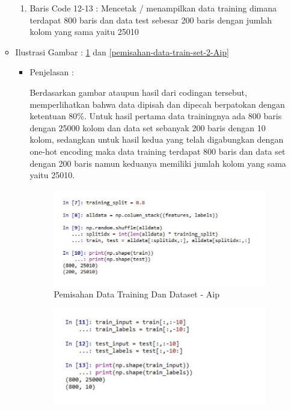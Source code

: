 \begin{enumerate}
\begin{itemize}
\begin{enumerate}
\item Baris Code 12-13 : Mencetak / menampilkan data training dimana terdapat 800 baris dan data test sebesar 200 baris dengan jumlah kolom yang sama yaitu 25010
\par
\end{enumerate}
\item  Ilustrasi Gambar : \ref{pemisahan-data-train-set-Aip} dan  \ref{pemisahan-data-train-set-2-Aip}
\begin{itemize}
\item Penjelasan : 
\par Berdasarkan gambar ataupun hasil dari codingan tersebut, memperlihatkan bahwa data dipisah dan dipecah berpatokan dengan ketentuan 80\%. Untuk hasil pertama data trainingnya ada 800 baris dengan 25000 kolom dan data set sebanyak 200 baris dengan 10 kolom, sedangkan untuk hasil kedua yang telah digabungkan dengan one-hot encoding maka data training terdapat 800 baris dan data set dengan 200 baris namun keduanya memiliki jumlah kolom yang sama yaitu 25010.
\par
\par
\begin{figure}[ht]
\centering
\includegraphics[scale=0.2]{figures/AIP/datatrainset.PNG}
\caption{Pemisahan Data Training Dan Dataset - Aip}
\label{pemisahan-data-train-set-Aip}
\end{figure}
\par
\par
\begin{figure}[ht]
\centering
\includegraphics[scale=0.2]{figures/AIP/datatrainset2.PNG}

\end{figure}
\end{itemize}
\end{itemize}
\end{enumerate}
